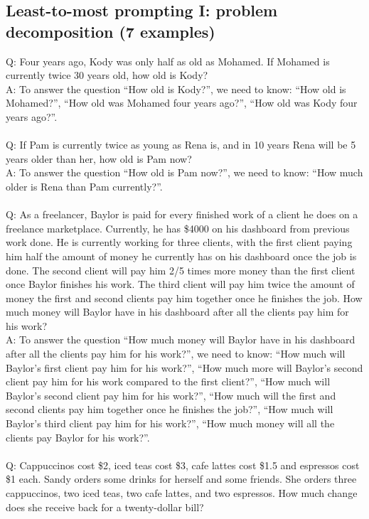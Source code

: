 \noindent
\subsection{Least-to-most prompting I: problem decomposition (7 examples)}
Q: Four years ago, Kody was only half as old as Mohamed. If Mohamed is currently twice 30 years old, how old is Kody? \\
A: To answer the question ``How old is Kody?'', we need to know: ``How old is Mohamed?'', ``How old was Mohamed four years ago?'', ``How old was Kody four years ago?''. \\
 \\
Q: If Pam is currently twice as young as Rena is, and in 10 years Rena will be 5 years older than her, how old is Pam now? \\
A: To answer the question ``How old is Pam now?'', we need to know: ``How much older is Rena than Pam currently?''. \\
 \\
Q: As a freelancer, Baylor is paid for every finished work of a client he does on a freelance marketplace. Currently, he has \$4000 on his dashboard from previous work done. He is currently working for three clients, with the first client paying him half the amount of money he currently has on his dashboard once the job is done. The second client will pay him 2/5 times more money than the first client once Baylor finishes his work. The third client will pay him twice the amount of money the first and second clients pay him together once he finishes the job. How much money will Baylor have in his dashboard after all the clients pay him for his work? \\
A: To answer the question ``How much money will Baylor have in his dashboard after all the clients pay him for his work?'', we need to know: ``How much will Baylor's first client pay him for his work?'', ``How much more will Baylor's second client pay him for his work compared to the first client?'', ``How much will Baylor's second client pay him for his work?'', ``How much will the first and second clients pay him together once he finishes the job?'', ``How much will Baylor's third client pay him for his work?'', ``How much money will all the clients pay Baylor for his work?''. \\
 \\
Q: Cappuccinos cost \$2, iced teas cost \$3, cafe lattes cost \$1.5 and espressos cost \$1 each. Sandy orders some drinks for herself and some friends. She orders three cappuccinos, two iced teas, two cafe lattes, and two espressos. How much change does she receive back for a twenty-dollar bill? \\
